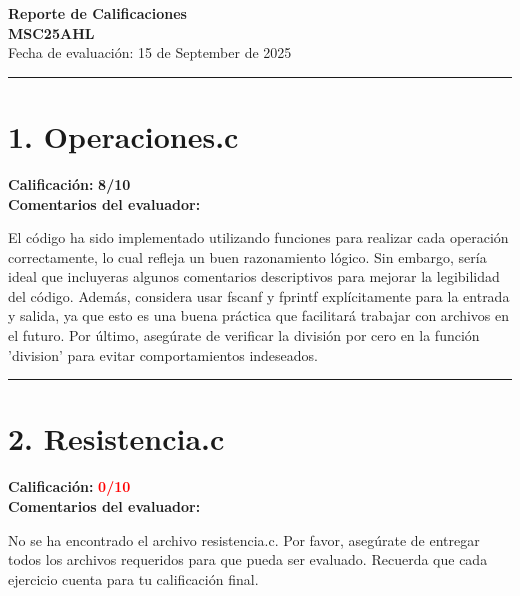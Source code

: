 \documentclass[11pt]{article}
\begin{document}
\begin{center}
\Large\textbf{\color{headerblue}Reporte de Calificaciones}\\[0.5cm]
\large\textbf{MSC25AHL}\\[0.3cm]
\normalsize Fecha de evaluación: 15 de September de 2025
\end{center}

\vspace{0.5cm}
\hrule
\vspace{0.5cm}


\section*{\textbf{1.} Operaciones.c}

\begin{minipage}{\textwidth}
\textbf{Calificación:} \textcolor{commentgreen}{\textbf{8/10}}\\[0.3cm]

\textbf{Comentarios del evaluador:}\\[0.2cm]
\begin{minipage}{\textwidth}
\small
El código ha sido implementado utilizando funciones para realizar cada operación correctamente, lo cual refleja un buen razonamiento lógico. Sin embargo, sería ideal que incluyeras algunos comentarios descriptivos para mejorar la legibilidad del código. Además, considera usar fscanf y fprintf explícitamente para la entrada y salida, ya que esto es una buena práctica que facilitará trabajar con archivos en el futuro. Por último, asegúrate de verificar la división por cero en la función 'division' para evitar comportamientos indeseados.
\end{minipage}
\end{minipage}

\vspace{0.5cm}
\hrule
\vspace{0.5cm}


\section*{\textbf{2.} Resistencia.c}

\begin{minipage}{\textwidth}
\textbf{Calificación:} \textcolor{red}{\textbf{0/10}}\\[0.3cm]

\textbf{Comentarios del evaluador:}\\[0.2cm]
\begin{minipage}{\textwidth}
\small
No se ha encontrado el archivo resistencia.c. Por favor, asegúrate de entregar todos los archivos requeridos para que pueda ser evaluado. Recuerda que cada ejercicio cuenta para tu calificación final.
\end{minipage}
\end{minipage}
\end{document}

